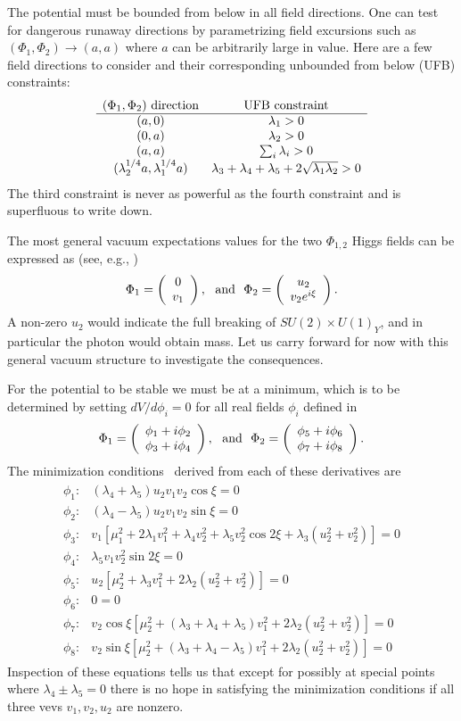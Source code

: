 \documentclass[12pt]{article}
\def\beq{\begin{eqnarray}}
\def\eeq{\end{eqnarray}}
\def\vector#1#2{\left( \begin{array}{c}#1\\ #2\end{array}\right)}
\begin{document}
The potential must be bounded from below in all field directions. One can test for dangerous runaway directions by parametrizing field excursions such as $(\Phi_1,\Phi_2)\to (a,a)$ where $a$ can be arbitrarily large in value.  Here are a few field directions to consider and their corresponding unbounded from below (UFB) constraints:
\beq
\begin{array}{cc}
(\Phi_1,\Phi_2)~{\rm direction} & {\rm UFB~constraint} \\
\hline
(a,0)& \lambda_1>0 \\
(0,a)& \lambda_2>0 \\
(a,a)& \sum_i\lambda_i>0 \\
(\lambda_2^{1/4}a,\lambda_1^{1/4}a) & \lambda_3+\lambda_4+\lambda_5+2\sqrt{\lambda_1\lambda_2}>0
\end{array}
\eeq
The third constraint is never as powerful as the fourth constraint and  is superfluous to write down. 

The most general vacuum expectations values for the two $\Phi_{1,2}$ Higgs fields can be expressed 
as (see, e.g., \cite{DiazCruz:1992uw})
\beq
\Phi_1=\vector{0}{v_1},~~{\rm and}~~\Phi_2=\vector{u_2}{v_2e^{i\xi}}.
\eeq
A non-zero $u_2$ would indicate the full breaking of $SU(2)\times U(1)_Y$, and in particular the photon would obtain mass. Let us carry forward for now with this general vacuum structure to investigate the consequences.

For the potential to be stable we must be at a minimum, which is to be determined by setting $dV/d\phi_i=0$ for all real fields $\phi_i$ defined in
\beq
\Phi_1=\vector{\phi_1+i\phi_2}{\phi_3+i\phi_4},~~{\rm and}~~\Phi_2=\vector{\phi_5+i\phi_6}{\phi_7+i\phi_8}.
\eeq
The minimization conditions~\cite{DiazCruz:1992uw} derived from each of these derivatives are
\beq
\begin{array}{cl}
\phi_1: & (\lambda_4+\lambda_5)u_2v_1v_2\cos\xi=0 \\
\phi_2: & (\lambda_4-\lambda_5)u_2v_1v_2\sin\xi =0 \\
\phi_3: & v_1[\mu^2_1+2\lambda_1v^2_1+\lambda_4v^2_2+\lambda_5v^2_2\cos 2\xi +\lambda_3(u^2_2+v^2_2)]=0 \\
\phi_4: & \lambda_5v_1v_2^2\sin 2\xi =0 \\
\phi_5: & u_2[\mu^2_2+\lambda_3v^2_1+2\lambda_2(u^2_2+v^2_2)]=0\\
\phi_6: & 0=0 \\
\phi_7: & v_2\cos\xi [\mu^2_2+(\lambda_3+\lambda_4+\lambda_5)v^2_1+2\lambda_2(u_2^2+v^2_2)]=0 \\
\phi_8: & v_2\sin\xi[\mu^2_2+(\lambda_3+\lambda_4-\lambda_5)v^2_1+2\lambda_2(u_2^2+v^2_2)]=0 
\end{array}
\eeq
Inspection of these equations tells us that except for possibly at special points where $\lambda_4\pm \lambda_5=0$ there is no hope in satisfying the minimization conditions if all three vevs $v_1,v_2,u_2$ are nonzero. 
\end{document}
